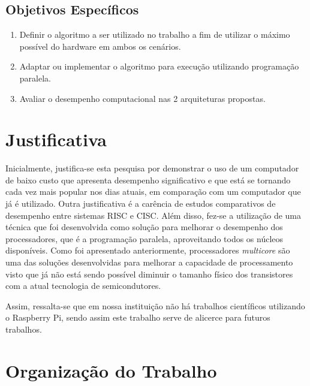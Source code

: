 \subsection{Objetivos Específicos}
\label{subsecao:objetivos_especificos}

\begin{enumerate}
\item Definir o algoritmo a ser utilizado no trabalho a fim de utilizar o máximo possível do hardware em ambos os cenários.

\item Adaptar ou implementar o algoritmo para execução utilizando programação paralela.

\item Avaliar o desempenho computacional nas 2 arquiteturas propostas.
\end{enumerate}

\section{Justificativa}
\label{secao:justificativa}

Inicialmente, justifica-se esta pesquisa por demonstrar o uso de um computador de baixo custo que apresenta desempenho significativo e que está se tornando cada vez mais popular nos dias atuais, em comparação com um computador que já é utilizado. Outra justificativa é a carência de estudos comparativos de desempenho entre sistemas RISC e CISC. Além disso, fez-se a utilização de uma técnica que foi desenvolvida como solução para melhorar o desempenho dos processadores, que é a programação paralela, aproveitando todos os núcleos disponíveis. Como foi apresentado anteriormente, processadores \textit{multicore} são uma das soluções desenvolvidas para melhorar a capacidade de processamento visto que já não está sendo possível diminuir o tamanho físico dos transistores com a atual tecnologia de semicondutores. 

Assim, ressalta-se que em nossa instituição não há trabalhos científicos utilizando o Raspberry Pi, sendo assim este trabalho serve de alicerce para futuros trabalhos.

\section{Organização do Trabalho}
\label{secao:organizacao_trabalho}

